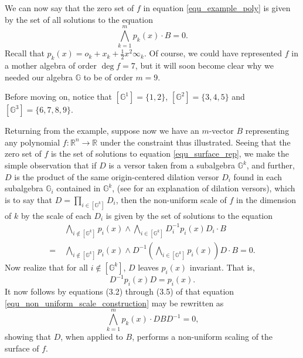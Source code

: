 \documentclass{birkjour}
\theoremstyle{definition}
\theoremstyle{remark}
\numberwithin{equation}{section}
\newcommand{\R}{\mathbb{R}}
\newcommand{\G}{\mathbb{G}}
\newcommand{\nvai}{\infty}
\newcommand{\nvao}{o}
\begin{document}
We can now say that the zero set of $f$ in equation \eqref{equ_example_poly}
is given by the set of all solutions to the equation
\begin{equation}\label{equ_surface_rep}
\bigwedge_{k=1}^m p_k(x)\cdot B = 0.
\end{equation}
Recall that $p_k(x)=\nvao_k+x_k+\frac{1}{2}x^2\nvai_k$.
Of course, we could have represented $f$ in a mother algebra of order $\deg f=7$,
but it will soon become clear why we needed our algebra $\G$ to be of order $m=9$.

Before moving on, notice that $[\G^1]=\{1,2\}$, $[\G^2]=\{3,4,5\}$ and
$[\G^3]=\{6,7,8,9\}$.

Returning from the example, suppose now we have an $m$-vector $B$ representing
any polynomial $f:\R^n\to\R$ under the constraint thus illustrated.  Seeing that
the zero set of $f$ is the set of solutions to equation \eqref{equ_surface_rep},
we make the simple observation that if $D$ is a versor taken from a subalgebra $\G^k$,
and further, $D$ is the product of the same origin-centered dilation versor $D_i$ found in each subalgebra
$\G_i$ contained in $\G^k$, (see \cite{Dorst07} for an explanation of dilation versors),
which is to say that $D=\prod_{i\in [\G^k]} D_i$,
then the non-uniform scale of $f$ in the dimension of $k$ by the scale of each
$D_i$ is given by the set of solutions to the equation
\begin{align}
  & \bigwedge_{i\not\in [\G^k]} p_i(x)\wedge\bigwedge_{i\in[\G^k]} D_i^{-1}p_i(x)D_i\cdot B \nonumber \\
 =\; & \bigwedge_{i\not\in [\G^k]} p_i(x)\wedge D^{-1}\left(\bigwedge_{i\in [\G^k]} p_i(x)\right)D\cdot B = 0.\label{equ_non_uniform_scale_construction}
\end{align}
Now realize that for all $i\not\in[\G^k]$, $D$ leaves $p_i(x)$ invariant.  That is,
\begin{equation*}
D^{-1}p_i(x)D=p_i(x).
\end{equation*}
It now follows by equations (3.2) through (3.5) of \cite{Parkin13} that equation \eqref{equ_non_uniform_scale_construction}
may be rewritten as
\begin{equation*}
\bigwedge_{k=1}^m p_k(x)\cdot DBD^{-1} = 0,
\end{equation*}
showing that $D$, when applied to $B$, performs a non-uniform scaling of the surface of $f$.
\end{document}
